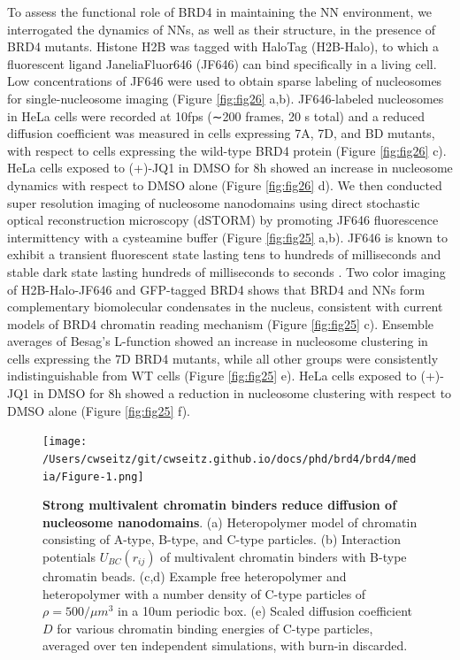 To assess the functional role of BRD4 in maintaining the NN environment, we interrogated the dynamics of NNs, as well as their structure, in the presence of BRD4 mutants. Histone H2B was tagged with HaloTag \parencite{Los2008} (H2B-Halo), to which a fluorescent ligand JaneliaFluor646 (JF646) can bind speciﬁcally in a living cell. Low concentrations of JF646 were used to obtain sparse labeling of nucleosomes for single-nucleosome imaging (Figure \ref{fig:fig26} a,b). JF646-labeled nucleosomes in HeLa cells were recorded at 10fps (∼200 frames, 20 s total) and a reduced diffusion coefficient was measured in cells expressing 7A, 7D, and BD mutants, with respect to cells expressing the wild-type BRD4 protein (Figure \ref{fig:fig26} c). HeLa cells exposed to (+)-JQ1 in DMSO for 8h showed an increase in nucleosome dynamics with respect to DMSO alone (Figure \ref{fig:fig26} d). We then conducted super resolution imaging of nucleosome nanodomains using direct stochastic optical reconstruction microscopy (dSTORM) by promoting JF646 fluorescence intermittency with a cysteamine buffer (Figure \ref{fig:fig25} a,b). JF646 is known to exhibit a transient fluorescent state lasting tens to hundreds of milliseconds and stable dark state lasting hundreds of milliseconds to seconds \parencite{Grimm2015}. Two color imaging of H2B-Halo-JF646 and GFP-tagged BRD4 shows that BRD4 and NNs form complementary biomolecular condensates in the nucleus, consistent with current models of BRD4 chromatin reading mechanism (Figure \ref{fig:fig25} c). Ensemble averages of Besag’s L-function showed an increase in nucleosome clustering in cells expressing the 7D BRD4 mutants, while all other groups were consistently indistinguishable from WT cells (Figure \ref{fig:fig25} e). HeLa cells exposed to (+)-JQ1 in DMSO for 8h showed a reduction in nucleosome clustering with respect to DMSO alone (Figure \ref{fig:fig25} f).  

\begin{figure}[t]
\texttt{[image: /Users/cwseitz/git/cwseitz.github.io/docs/phd/brd4/brd4/media/Figure-1.png]}
\caption{\textbf{Strong multivalent chromatin binders reduce diffusion of nucleosome nanodomains}. (a) Heteropolymer model of chromatin consisting of A-type, B-type, and C-type particles. (b) Interaction potentials $U_{BC}(r_{ij})$ of multivalent chromatin binders with B-type chromatin beads. (c,d) Example free heteropolymer and heteropolymer with a number density of C-type particles of $\rho=500/\mu m^3$ in a 10um periodic box. (e) Scaled diffusion coefficient $D$ for various chromatin binding energies of C-type particles, averaged over ten independent simulations, with burn-in discarded.}
\label{fig:fig24}
\end{figure}

